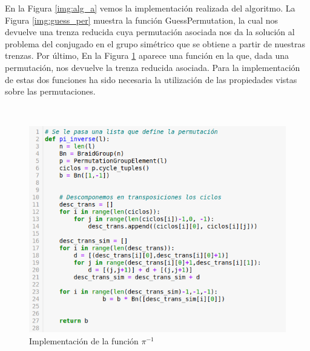 \documentclass[12pt]{book}
\theoremstyle{definition}
\begin{document}
En la Figura \ref{img:alg_a} vemos la implementación realizada del algoritmo. La Figura \ref{img:guess_per} muestra la función GuessPermutation, la cual nos devuelve una trenza reducida cuya permutación asociada nos da la solución al problema del conjugado en el grupo simétrico que se obtiene a partir de nuestras trenzas. Por último, En la Figura \ref{img:pi_inverse} aparece una función en la que, dada una permutación, nos devuelve la trenza reducida asociada. Para la implementación de estas dos funciones ha sido necesaria la utilización de las propiedades vistas sobre las permutaciones.

\ 
\newline
\newline
\begin{figure}[h!]
\centering
\includegraphics[scale=0.5]{imgs/pi_inverse.png} 
\caption{Implementación de la función $\pi^{-1}$}
\label{img:pi_inverse}
\end{figure}
\ 
\newline
\newline
\end{document}
